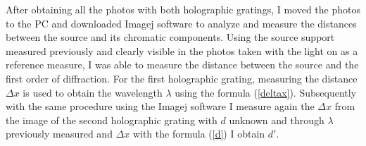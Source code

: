 After obtaining all the photos with both holographic gratings, I moved the photos to the PC and downloaded Imagej software to analyze and measure the distances between the source and its chromatic components. Using the source support measured previously and clearly visible in the photos taken with the light on as a reference measure, I was able to measure the distance between the source and the first order of diffraction. For the first holographic grating, measuring the distance $\Delta x$ is used to obtain the wavelength $\lambda$ using the formula (\ref{deltax}). Subsequently with the same procedure using the Imagej software I measure again the $\Delta x $ from the image of the second holographic grating with $d$ unknown and through $\lambda$ previously measured and $\Delta x$ with the formula (\ref{d}) I obtain $d'$.

